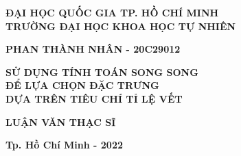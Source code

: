 \begin{titlepage}
	\begin{center}
		{\bf  ĐẠI HỌC QUỐC GIA TP. HỒ CHÍ MINH}\\
		{\bf TRƯỜNG ĐẠI HỌC KHOA HỌC TỰ NHIÊN}\\
		\hfill
		
		\vspace*{2cm}
		
		{\large\bf  PHAN THÀNH NHÂN - 20C29012}
		
		\vspace*{3cm}
		
		{\huge\bf SỬ DỤNG TÍNH TOÁN SONG SONG\\
			ĐỂ LỰA CHỌN ĐẶC TRƯNG\\
			DỰA TRÊN TIÊU CHÍ TỈ LỆ VẾT	
	}
		
		\vspace*{3cm}
		
		{\large\bf LUẬN VĂN THẠC SĨ}
		
		{\bf Tp. Hồ Chí Minh - 2022}
	\end{center}
	
\end{titlepage}

